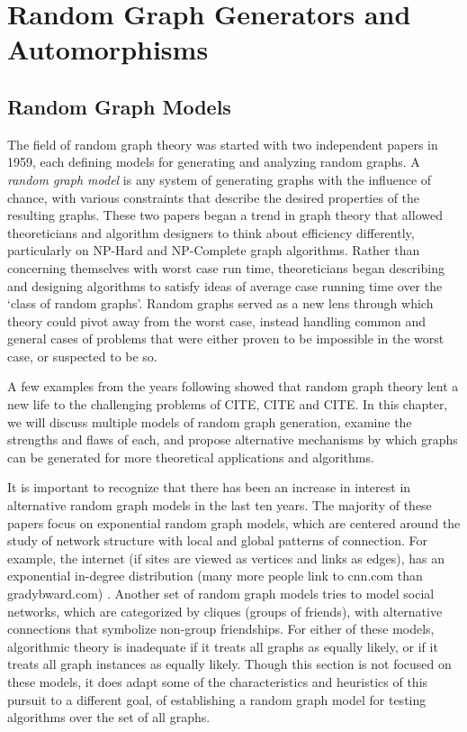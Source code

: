 \chapter{Random Graph Generators and Automorphisms}

\section{Random Graph Models}

The field of random graph theory was started with two independent papers in 1959, each defining models for generating and analyzing random graphs.
A \emph{random graph model} is any system of generating graphs with the influence of chance, with various constraints that describe the desired properties of the resulting graphs.
These two papers began a trend in graph theory that allowed theoreticians and algorithm designers to think about efficiency differently, particularly on NP-Hard and NP-Complete graph algorithms.
Rather than concerning themselves with worst case run time, theoreticians began describing and designing algorithms to satisfy ideas of average case running time over the `class of random graphs'.
Random graphs served as a new lens through which theory could pivot away from the worst case, instead handling common and general cases of problems that were either proven to be impossible in the worst case, or suspected to be so. 

A few examples from the years following showed that random graph theory lent a new life to the challenging problems of CITE, CITE and CITE.
In this chapter, we will discuss multiple models of random graph generation, examine the strengths and flaws of each, and propose alternative mechanisms by which graphs can be generated for more theoretical applications and algorithms.

It is important to recognize that there has been an increase in interest in alternative random graph models in the last ten years.
The majority of these papers focus on exponential random graph models, which are centered around the study of network structure with local and global patterns of connection.
For example, the internet (if sites are viewed as vertices and links as edges), has an exponential in-degree distribution (many more people link to cnn.com than gradybward.com) \cite{exponentialgraphs}.
Another set of random graph models tries to model social networks, which are categorized by cliques (groups of friends), with alternative connections that symbolize non-group friendships.
For either of these models, algorithmic theory is inadequate if it treats all graphs as equally likely, or if it treats all graph instances as equally likely.
Though this section is not focused on these models, it does adapt some of the characteristics and heuristics of this pursuit to a different goal, of establishing a random graph model for testing algorithms over the set of all graphs.

